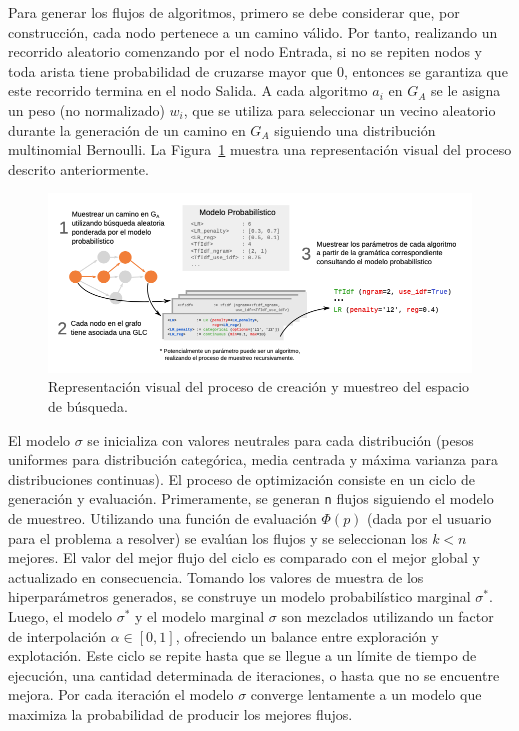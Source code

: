 Para generar los flujos de algoritmos, primero se debe considerar que, por construcción, cada nodo pertenece a un camino válido. Por tanto, realizando un recorrido aleatorio comenzando por el nodo Entrada, si no se repiten nodos y toda arista tiene probabilidad de cruzarse mayor que 0, entonces se garantiza que este recorrido termina en el nodo Salida. A cada algoritmo $a_i$ en $G_A$ se le asigna un peso (no normalizado) $w_i$, que se utiliza para seleccionar un vecino aleatorio durante la generación de un camino en $G_A$ siguiendo una distribución multinomial Bernoulli. La Figura~\ref{fig:autogoal} muestra una representación visual del proceso descrito anteriormente.

\begin{figure}[H]
	\centering
	\includegraphics[scale=.5]{Figures/autogoal.png}
	\caption{Representación visual del proceso de creación y muestreo del
		espacio de búsqueda.}
	\label{fig:autogoal}
\end{figure}

El modelo $\sigma$ se inicializa con valores neutrales para cada distribución (pesos uniformes para distribución categórica, media centrada y máxima varianza para distribuciones continuas). El proceso de optimización consiste en un ciclo de generación y evaluación. Primeramente, se generan \texttt{n} flujos siguiendo el modelo de muestreo. Utilizando una función de evaluación $\Phi(p)$ (dada por el usuario para el problema a resolver) se evalúan los flujos y se seleccionan los $k < n$ mejores. El valor del mejor flujo del ciclo es comparado con el mejor global y actualizado en consecuencia. Tomando los valores de muestra de los hiperparámetros generados, se construye un modelo probabilístico marginal $\sigma^*$. Luego, el modelo $\sigma^*$ y el modelo marginal $\sigma$ son mezclados utilizando un factor de interpolación $\alpha \in [0, 1]$, ofreciendo un balance entre exploración y explotación. Este ciclo se repite hasta que se llegue a un límite de tiempo de ejecución, una cantidad determinada de iteraciones, o hasta que no se encuentre mejora. Por cada iteración el modelo $\sigma$ converge lentamente a un modelo que maximiza la probabilidad de producir los mejores flujos. 

